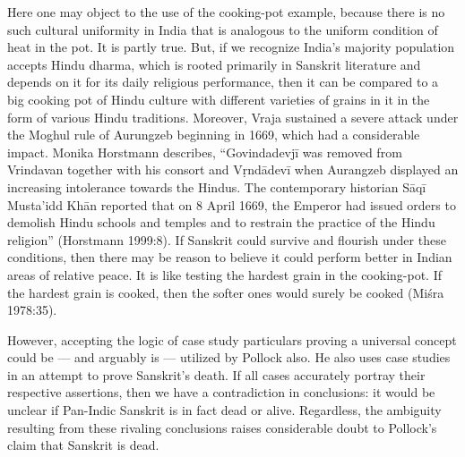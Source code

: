 Here one may object to the use of the cooking-pot example, because there is no such cultural uniformity in India that is analogous to the uniform condition of heat in the pot. It is partly true. But, if we recognize India’s majority population accepts Hindu dharma, which is rooted primarily in Sanskrit literature and depends on it for its daily religious performance, then it can be compared to a big cooking pot of Hindu culture with different varieties of grains in it in the form of various Hindu traditions. Moreover, Vraja sustained a severe attack under the Moghul rule of Aurungzeb beginning in 1669, which had a considerable impact. Monika Horstmann describes, “Govindadevjī was removed from Vrindavan together with his consort and Vṛndādevī when Aurangzeb displayed an increasing intolerance towards the Hindus. The contemporary historian Sāqī Musta’idd Khān reported that on 8 April 1669, the Emperor had issued orders to demolish Hindu schools and temples and to restrain the practice of the Hindu religion” (Horstmann 1999:8). If Sanskrit could survive and flourish under these conditions, then there may be reason to believe it could perform better in Indian areas of relative peace. It is like testing the hardest grain in the cooking-pot. If the hardest grain is cooked, then the softer ones would surely be cooked (Miśra 1978:35). 

However, accepting the logic of case study particulars proving a universal concept could be — and arguably is — utilized by Pollock also. He also uses case studies in an attempt to prove Sanskrit’s death. If all cases accurately portray their respective assertions, then we have a contradiction in conclusions: it would be unclear if Pan-Indic Sanskrit is in fact dead or alive. Regardless, the ambiguity resulting from these rivaling conclusions raises considerable doubt to Pollock’s claim that Sanskrit is dead. 

